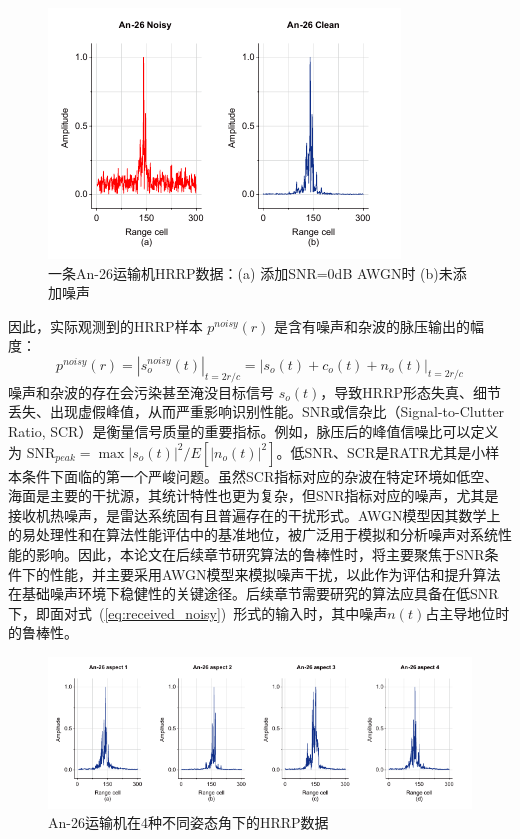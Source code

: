 \begin{figure}[h!]
    \centering
    \includegraphics[width=0.5\linewidth]{figures/noise.pdf} %
    \caption{一条An-26运输机HRRP数据：(a) 添加SNR=0dB AWGN时 (b)未添加噪声}
    \label{fig:dataset_chap3}
\end{figure}

因此，实际观测到的HRRP样本 $p^{noisy}(r)$ 是含有噪声和杂波的脉压输出的幅度：
\begin{equation}
    p^{noisy}(r) = |s_o^{noisy}(t)|_{t=2r/c} = |s_o(t) + c_o(t) + n_o(t)|_{t=2r/c}
    \label{eq:hrrp_noisy}
\end{equation}
噪声和杂波的存在会污染甚至淹没目标信号 $s_o(t)$，导致HRRP形态失真、细节丢失、出现虚假峰值，从而严重影响识别性能。SNR或信杂比（Signal-to-Clutter Ratio, SCR）是衡量信号质量的重要指标。例如，脉压后的峰值信噪比可以定义为 $\text{SNR}_{peak} = \max |s_o(t)|^2 / E[|n_o(t)|^2]$。低SNR、SCR是RATR尤其是小样本条件下面临的第一个严峻问题。虽然SCR指标对应的杂波在特定环境如低空、海面是主要的干扰源，其统计特性也更为复杂，但SNR指标对应的噪声，尤其是接收机热噪声，是雷达系统固有且普遍存在的干扰形式。AWGN模型因其数学上的易处理性和在算法性能评估中的基准地位，被广泛用于模拟和分析噪声对系统性能的影响。因此，本论文在后续章节研究算法的鲁棒性时，将主要聚焦于SNR条件下的性能，并主要采用AWGN模型来模拟噪声干扰，以此作为评估和提升算法在基础噪声环境下稳健性的关键途径。后续章节需要研究的算法应具备在低SNR下，即面对式~(\ref{eq:received_noisy})~形式的输入时，其中噪声$n(t)$占主导地位时的鲁棒性。

\begin{figure}[h!]
    \centering
    \includegraphics[width=\linewidth]{figures/aspect.pdf} %
    \caption{An-26运输机在4种不同姿态角下的HRRP数据}
    \label{fig:dataset_chap3}
\end{figure}

